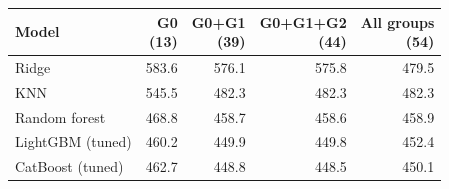 \begin{tabular}{@{}lrrrr@{}}
\hline
\textbf{Model} & \shortstack{\textbf{G0}\\(13)} & \shortstack{\textbf{G0+G1}\\(39)} & \shortstack{\textbf{G0+G1+G2}\\(44)} & \shortstack{\textbf{All groups}\\(54)} \\
\hline
Ridge & 583.6 & 576.1 & 575.8 & 479.5 \\
KNN & 545.5 & 482.3 & 482.3 & 482.3 \\
Random forest & 468.8 & 458.7 & 458.6 & 458.9 \\
LightGBM (tuned) & 460.2 & 449.9 & 449.8 & 452.4 \\
CatBoost (tuned) & 462.7 & 448.8 & 448.5 & 450.1 \\
\hline
\end{tabular}
